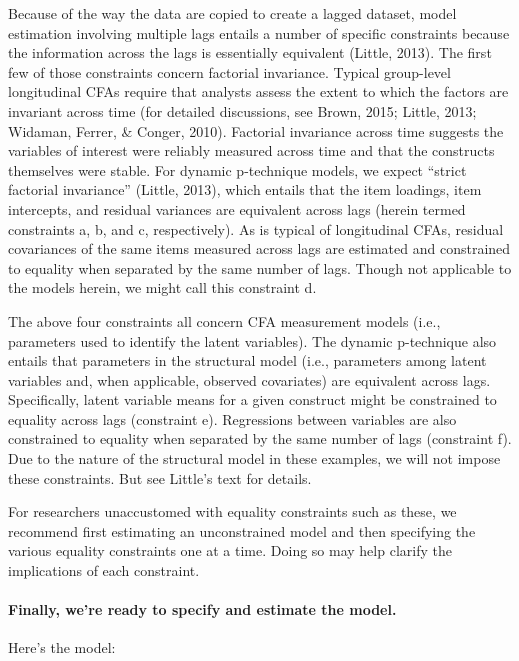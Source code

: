 \documentclass[]{article}
\let\oldparagraph\paragraph
\renewcommand{\paragraph}[1]{\oldparagraph{#1}\mbox{}}
\begin{document}
Because of the way the data are copied to create a lagged dataset, model
estimation involving multiple lags entails a number of specific
constraints because the information across the lags is essentially
equivalent (Little, 2013). The first few of those constraints concern
factorial invariance. Typical group-level longitudinal CFAs require that
analysts assess the extent to which the factors are invariant across
time (for detailed discussions, see Brown, 2015; Little, 2013; Widaman,
Ferrer, \& Conger, 2010). Factorial invariance across time suggests the
variables of interest were reliably measured across time and that the
constructs themselves were stable. For dynamic p-technique models, we
expect ``strict factorial invariance'' (Little, 2013), which entails
that the item loadings, item intercepts, and residual variances are
equivalent across lags (herein termed constraints a, b, and c,
respectively). As is typical of longitudinal CFAs, residual covariances
of the same items measured across lags are estimated and constrained to
equality when separated by the same number of lags. Though not
applicable to the models herein, we might call this constraint d.

The above four constraints all concern CFA measurement models (i.e.,
parameters used to identify the latent variables). The dynamic
p-technique also entails that parameters in the structural model (i.e.,
parameters among latent variables and, when applicable, observed
covariates) are equivalent across lags. Specifically, latent variable
means for a given construct might be constrained to equality across lags
(constraint e). Regressions between variables are also constrained to
equality when separated by the same number of lags (constraint f). Due
to the nature of the structural model in these examples, we will not
impose these constraints. But see Little's text for details.

For researchers unaccustomed with equality constraints such as these, we
recommend first estimating an unconstrained model and then specifying
the various equality constraints one at a time. Doing so may help
clarify the implications of each constraint.

\paragraph{Finally, we're ready to specify and estimate the
model.}\label{finally-were-ready-to-specify-and-estimate-the-model.}

Here's the model:
\end{document}
